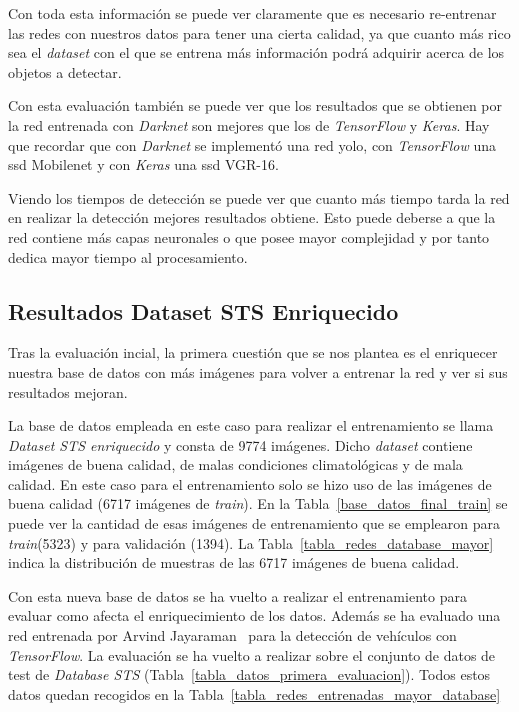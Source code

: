 Con toda esta información se puede ver claramente que es necesario re-entrenar las redes con nuestros datos para tener una cierta calidad, ya que cuanto más rico sea el \textit{dataset} con el que se entrena más información podrá adquirir acerca de los objetos a detectar.

Con esta evaluación también se puede ver que los resultados que se obtienen por la red entrenada con \textit{Darknet} son mejores que los de \textit{TensorFlow} y \textit{Keras}. Hay que recordar que con \textit{Darknet} se implementó una red \acrshort{yolo}, con \textit{TensorFlow} una \acrshort{ssd} Mobilenet y con \textit{Keras} una \acrshort{ssd} VGR-16.

Viendo los tiempos de detección se puede ver que cuanto más tiempo tarda la red en realizar la detección mejores resultados obtiene. Esto puede deberse a que la red contiene más capas neuronales o que posee mayor complejidad y por tanto dedica mayor tiempo al procesamiento.


\subsection{Resultados Dataset STS Enriquecido}\label{sec.ampliado_dataset}

Tras la evaluación incial, la primera cuestión que se nos plantea es el enriquecer nuestra base de datos con más imágenes para volver a entrenar la red y ver si sus resultados mejoran. 

La base de datos empleada en este caso para realizar el entrenamiento se llama \textit{Dataset STS enriquecido} y consta de 9774 imágenes. Dicho \textit{dataset} contiene imágenes de buena calidad, de malas condiciones climatológicas y de mala calidad. En este caso para el entrenamiento solo se hizo uso de las imágenes de buena calidad (6717 imágenes de \textit{train}). En la Tabla~\ref{base_datos_final_train} se puede ver la cantidad de esas imágenes de entrenamiento que se emplearon para \textit{train}(5323) y para validación (1394). La Tabla~\ref{tabla_redes_database_mayor} indica la distribución de muestras de las 6717 imágenes de buena calidad.

Con esta nueva base de datos se ha vuelto a realizar el entrenamiento para evaluar como afecta el enriquecimiento de los datos. Además se ha evaluado una red entrenada por Arvind Jayaraman~\cite{CarND_VehicleDetection} para la detección de vehículos con \textit{TensorFlow}. La evaluación se ha vuelto a realizar sobre el conjunto de datos de test de \textit{Database STS} (Tabla~\ref{tabla_datos_primera_evaluacion}). Todos estos datos quedan recogidos en la Tabla~\ref{tabla_redes_entrenadas_mayor_database}

